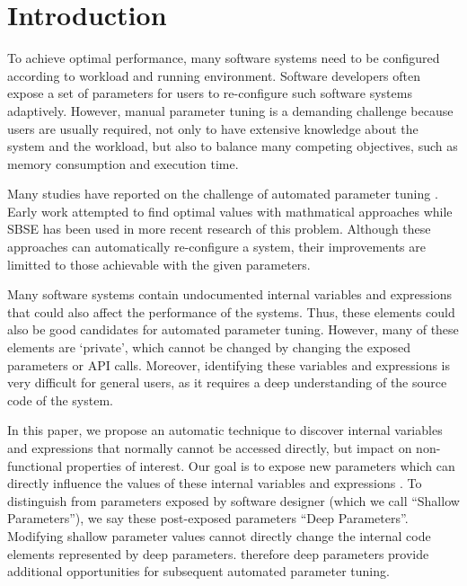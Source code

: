 
\section{Introduction}

To achieve optimal performance, many software systems need to be configured according to workload and running environment. 
Software developers often expose a set of parameters for users to re-configure such software systems adaptively.
However, manual parameter tuning is a demanding challenge because users are usually required, not only to have extensive knowledge about the system and the workload, but also to balance many competing objectives, such as memory consumption and execution time.

Many studies have reported on the challenge of automated parameter tuning \cite{Hoffmann:2011:DKR:1961296.1950390, Vuduc01statisticalmodels,autotuning,Whaley:1998:ATL:509058.509096,Tapus:2002:AHT:762761.762771, hutter2009paramils,arcuri-ssbse-2011,Hoffmann:2011:DKR:1961296.1950390}. Early work attempted to find optimal values with mathmatical approaches \cite{Vuduc01statisticalmodels,autotuning,Whaley:1998:ATL:509058.509096,Tapus:2002:AHT:762761.762771} while SBSE \cite{Harman:2007:CSF:1253532.1254729} has been used in more recent research \cite{hutter2009paramils,arcuri-ssbse-2011,Hoffmann:2011:DKR:1961296.1950390} of this problem. Although these approaches can automatically re-configure a system, their improvements are limitted to those achievable with the given parameters.


Many software systems contain undocumented internal variables and expressions that could also affect the performance of the systems. Thus, these elements could also be good candidates for automated parameter tuning. However, many of these elements are `private', which cannot be changed by changing the exposed parameters or API calls. Moreover, identifying these variables and expressions is very difficult for general users, as it requires a deep understanding of the source code of the system. 


In this paper, we propose an automatic technique to discover internal variables and expressions that normally cannot be accessed directly, but impact on non-functional properties of interest. Our goal is to expose new parameters which can directly influence the values of these internal variables and expressions \cite{harman2014genetic}. To distinguish from parameters exposed by software designer (which we call ``Shallow Parameters''), we say these post-exposed parameters ``Deep Parameters''. Modifying shallow parameter values cannot directly change the internal code elements represented by deep parameters. therefore deep parameters provide additional opportunities for subsequent automated parameter tuning.


